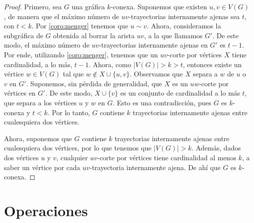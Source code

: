  \begin{proof}
     Primero, sea $G$ una gr\'afica $k$-conexa. Suponemos que existen $u,v \in
     V(G)$, de manera que el m\'aximo n\'umero de $uv$-trayectorias internamente
     ajenas sea $t$, con $t<k$. Por \cref{coro:menger} tenemos que $u \sim v$.
     Ahora, consideramos la subgr\'afica de $G$ obtenida al borrar la arista
     $uv$, a la que llamamos $G'$. De este modo, el m\'aximo n\'umero de
     $uv$-trayectorias internamente ajenas en $G'$ es $t-1$. Por ende,
     utilizando \cref{coro:menger}, tenemos que un $uv$-corte por v\'ertices $X$
     tiene cardinalidad, a lo m\'as, $t-1$. Ahora, como $|V(G)| > k > t$,
     entonces existe un v\'ertice $w \in V(G)$ tal que $w \notin X\cup\{u,v\}$.
     Observamos que $X$ separa a $w$ de $u$ o $v$ en $G'$. Suponemos, sin
     p\'erdida de generalidad, que $X$ es un $uw$-corte por v\'ertices en $G'$.
     De este modo, $X\cup\{v\}$ es un conjunto de cardinalidad a lo m\'as $t$,
     que separa a los v\'ertices $u$ y $w$ en $G$. Esto es una contradicci\'on,
     pues $G$ es $k$-conexa y $t < k$. Por lo tanto, $G$ contiene $k$
     trayectorias internamente ajenas entre cualesquiera dos v\'ertices.
 
     Ahora, suponemos que $G$ contiene $k$ trayectorias internamente ajenas
     entre cualesquiera dos v\'ertices, por lo que tenemos que $|V(G)|>k$.
     Adem\'as, dados dos v\'ertices $u$ y $v$, cualquier $uv$-corte por
     v\'ertices tiene cardinalidad al menos $k$, a saber un v\'ertice por cada
     $uv$-trayectoria internamente ajena. De ah\'i que $G$ es $k$-conexa.
         
 \end{proof}
 
\section{Operaciones}
\label{sec:operaciones}

